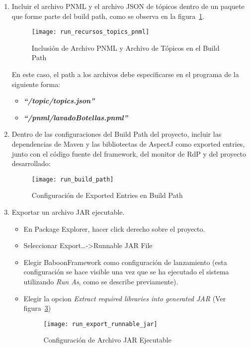 \begin{enumerate}
  \item Incluir el archivo PNML y el archivo JSON de tópicos dentro de un
  paquete que forme parte del build path, como se observa en la
  figura~\ref{fig:run_recursos_topics_pnml}.
  \begin{figure}[H]
    \centering
    \texttt{[image: run\_recursos\_topics\_pnml]}
    \caption{Inclusión de Archivo PNML y Archivo de Tópicos en el Build
    Path}
    \label{fig:run_recursos_topics_pnml}
   \end{figure}
   En este caso, el path a los archivos debe especificarse en el programa de la
   siguiente forma:
   \begin{itemize}
     \item \textbf{\emph{``/topic/topics.json''}}
     \item \textbf{\emph{``/pnml/lavadoBotellas.pnml''}}
   \end{itemize}
   
   \item Dentro de las configuraciones del Build Path del proyecto, incluir
   las dependencias de Maven y las bibliotectas de AspectJ como exported
   entries, junto con el código fuente del framework, del monitor de RdP y del
   proyecto desarrollado:
    \begin{figure}[H]
    \centering
    \texttt{[image: run\_build\_path]}
    \caption{Configuración de Exported Entries en Build Path}
    \label{fig:run_build_path}
    \end{figure}
    
   \item Exportar un archivo JAR ejecutable.
       \begin{itemize}
         \item En Package Explorer, hacer click derecho sobre el proyecto.
         \item Seleccionar Export\ldots -\textgreater Runnable JAR File
         \item Elegir BaboonFramework como configuración de lanzamiento
         (esta configuración se hace visible una vez que se ha ejecutado
         el sistema utilizando \emph{Run As}, como se describe previamente).
         \item Elegir la opcion \emph{Extract required libraries into generated
         JAR} (Ver figura~\ref{fig:run_export_runnable_jar})
         \begin{figure}[H]
            \centering
            \texttt{[image: run\_export\_runnable\_jar]}
            \caption{Configuración de Archivo JAR Ejecutable}
            \label{fig:run_export_runnable_jar}
         \end{figure}
       \end{itemize}
\end{enumerate}

